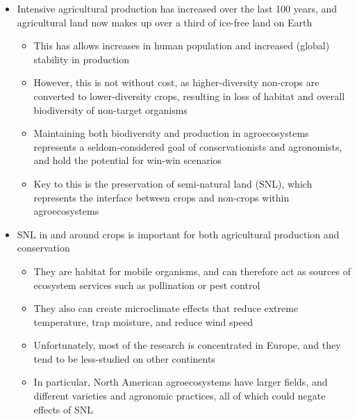 \documentclass[]{elsarticle} %
\providecommand{\tightlist}{%
  \setlength{\itemsep}{0pt}\setlength{\parskip}{0pt}}
\begin{document}
\begin{itemize}
\tightlist
\item
  Intensive agricultural production has increased over the last 100 years, and agricultural land now makes up over a third of ice-free land on Earth

  \begin{itemize}
  \tightlist
  \item
    This has allows increases in human population and increased (global) stability in production
  \item
    However, this is not without cost, as higher-diversity non-crops are converted to lower-diversity crops, resulting in loss of habitat and overall biodiversity of non-target organisms
  \item
    Maintaining both biodiversity and production in agroecosystems represents a seldom-considered goal of conservationists and agronomists, and hold the potential for win-win scenarios
  \item
    Key to this is the preservation of semi-natural land (SNL), which represents the interface between crops and non-crops within agroecosystems
  \end{itemize}
\item
  SNL in and around crops is important for both agricultural production and conservation

  \begin{itemize}
  \tightlist
  \item
    They are habitat for mobile organisms, and can therefore act as sources of ecosystem services such as pollination or pest control
  \item
    They also can create microclimate effects that reduce extreme temperature, trap moisture, and reduce wind speed
  \item
    Unfortunately, most of the research is concentrated in Europe, and they tend to be less-studied on other continents
  \item
    In particular, North American agroecosystems have larger fields, and different varieties and agronomic practices, all of which could negate effects of SNL
  \end{itemize}
\end{itemize}
\end{document}
